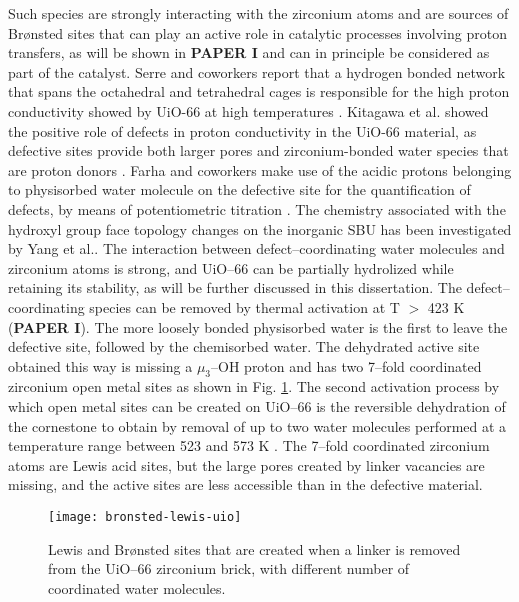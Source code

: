 Such species are strongly interacting with the zirconium atoms and are sources of Br\o{}nsted sites that can play an active role in catalytic processes involving proton transfers, as will be shown in \textbf{PAPER I} and can in principle be considered as part of the catalyst. Serre and coworkers report that a hydrogen bonded network that spans the octahedral and tetrahedral cages is responsible for the high proton conductivity showed by UiO-66 at high temperatures \cite{borges2016proton}. Kitagawa et al. showed the positive role of defects in proton conductivity in the UiO-66 material, as defective sites provide both larger pores and zirconium-bonded water species that are proton donors \cite{taylor2015defect}. Farha and coworkers make use of the acidic protons belonging to physisorbed water molecule on the defective site for the quantification of defects, by means of potentiometric titration \cite{klet2016evaluation}. The chemistry associated with the hydroxyl group face topology changes on the inorganic SBU has been investigated by Yang et al.\cite{yang2016tuning}. The interaction between defect--coordinating water molecules and zirconium atoms is strong, and UiO--66 can be partially hydrolized\cite{decoste2013stability} while retaining its stability, as will be further discussed in this dissertation.
\npar
The defect--coordinating species can be removed by thermal activation at T $>$ 423 K (\textbf{PAPER I}). The more loosely bonded physisorbed water is the first to leave the defective site, followed by the chemisorbed water. The dehydrated active site obtained this way is missing a $\mu_{3}$--OH proton and has two 7--fold coordinated zirconium open metal sites as shown in Fig. \ref{fig:bronsted-lewis-uio}. 
\npar
The second activation process by which open metal sites can be created on UiO--66 is the reversible dehydration of the  cornestone to obtain  by removal of up to two water molecules performed at a temperature range between 523 and 573 K \cite{valenzano2011disclosing}. The 7--fold coordinated zirconium atoms are Lewis acid sites, but the large pores created by linker vacancies are missing, and the active sites are less accessible than in the defective material. 
\begin{figure}[!htbp]
	\centering
 	\texttt{[image: bronsted-lewis-uio]}
	\caption{Lewis and Br\o{}nsted sites that are created when a linker is removed from the UiO--66 zirconium brick, with different number of coordinated water molecules.}
	\label{fig:bronsted-lewis-uio}
\end{figure}

